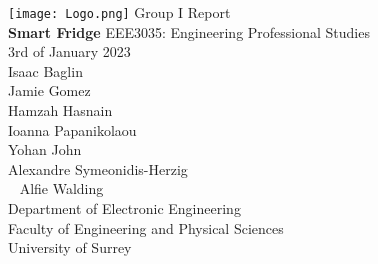 \begin{titlepage}
    \begin{center}
    \texttt{[image: Logo.png]} %
    \vfill
    \Huge
    Group I Report \\
    \textbf{Smart Fridge}
    \vfill
    \Large
    EEE3035: Engineering Professional Studies \\
    3rd of January 2023\\
    \vfill
    Isaac Baglin \\
    Jamie Gomez \\
    Hamzah Hasnain \\
    Ioanna Papanikolaou \\
    Yohan John \\
    Alexandre Symeonidis-Herzig \\ 
    Alfie Walding \\
    \vfill
    \Large
    Department of Electronic Engineering\\
    Faculty of Engineering and Physical Sciences\\
    University of Surrey\\
    \end{center}
\end{titlepage}